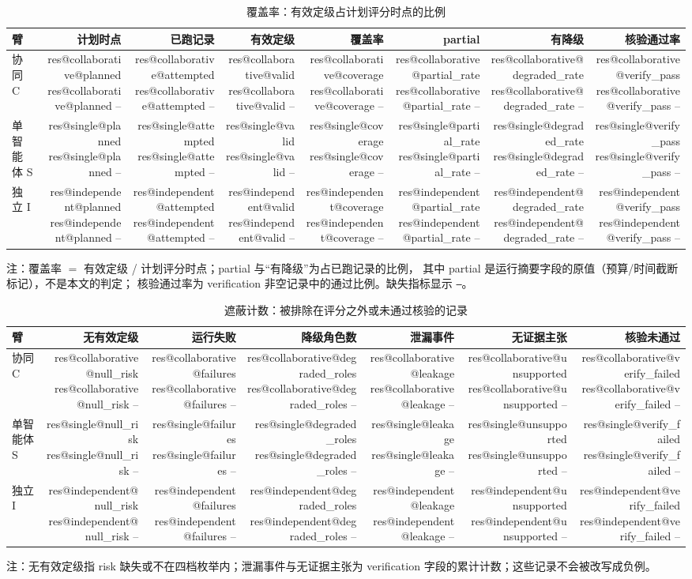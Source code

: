 \documentclass[UTF8,fontset=fandol,11pt,a4paper]{ctexart}
\makeatletter
\newcommand{\RESULT}[2]{%
  \ifcsname res@#1@#2\endcsname
    \csname res@#1@#2\endcsname
  \else
    --%
  \fi}
\makeatother
\begin{document}
\begin{table}[t]
\centering
\caption{覆盖率：有效定级占计划评分时点的比例}
\label{tab:coverage}
\footnotesize
\setlength{\tabcolsep}{3.5pt}
\begin{tabular}{lrrrrrrr}
\toprule
臂 & 计划时点 & 已跑记录 & 有效定级 & 覆盖率 & partial & 有降级 & 核验通过率 \\
\midrule
协同 C & \RESULT{collaborative}{planned} & \RESULT{collaborative}{attempted} &
\RESULT{collaborative}{valid} & \RESULT{collaborative}{coverage} &
\RESULT{collaborative}{partial_rate} & \RESULT{collaborative}{degraded_rate} &
\RESULT{collaborative}{verify_pass} \\
单智能体 S & \RESULT{single}{planned} & \RESULT{single}{attempted} &
\RESULT{single}{valid} & \RESULT{single}{coverage} &
\RESULT{single}{partial_rate} & \RESULT{single}{degraded_rate} &
\RESULT{single}{verify_pass} \\
独立 I & \RESULT{independent}{planned} & \RESULT{independent}{attempted} &
\RESULT{independent}{valid} & \RESULT{independent}{coverage} &
\RESULT{independent}{partial_rate} & \RESULT{independent}{degraded_rate} &
\RESULT{independent}{verify_pass} \\
\bottomrule
\end{tabular}
\par\smallskip
\raggedright\scriptsize
注：覆盖率 $=$ 有效定级 / 计划评分时点；partial 与“有降级”为占已跑记录的比例，
其中 partial 是运行摘要字段的原值（预算/时间截断标记），不是本文的判定；
核验通过率为 verification 非空记录中的通过比例。缺失指标显示 \texttt{--}。
\end{table}

\begin{table}[t]
\centering
\caption{遮蔽计数：被排除在评分之外或未通过核验的记录}
\label{tab:masking}
\footnotesize
\setlength{\tabcolsep}{3.5pt}
\begin{tabular}{lrrrrrr}
\toprule
臂 & 无有效定级 & 运行失败 & 降级角色数 & 泄漏事件 & 无证据主张 & 核验未通过 \\
\midrule
协同 C & \RESULT{collaborative}{null_risk} & \RESULT{collaborative}{failures} &
\RESULT{collaborative}{degraded_roles} & \RESULT{collaborative}{leakage} &
\RESULT{collaborative}{unsupported} & \RESULT{collaborative}{verify_failed} \\
单智能体 S & \RESULT{single}{null_risk} & \RESULT{single}{failures} &
\RESULT{single}{degraded_roles} & \RESULT{single}{leakage} &
\RESULT{single}{unsupported} & \RESULT{single}{verify_failed} \\
独立 I & \RESULT{independent}{null_risk} & \RESULT{independent}{failures} &
\RESULT{independent}{degraded_roles} & \RESULT{independent}{leakage} &
\RESULT{independent}{unsupported} & \RESULT{independent}{verify_failed} \\
\bottomrule
\end{tabular}
\par\smallskip
\raggedright\scriptsize
注：无有效定级指 risk 缺失或不在四档枚举内；泄漏事件与无证据主张为 verification
字段的累计计数；这些记录不会被改写成负例。
\end{table}
\end{document}

